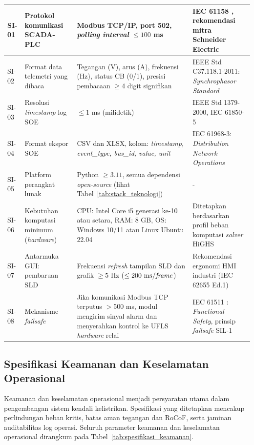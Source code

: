 \begin{longtable}{|p{0.8cm}|p{3.5cm}|p{4.5cm}|p{5cm}|}
SI-01 & Protokol komunikasi SCADA-PLC & Modbus TCP/IP, port 502, \textit{polling interval} $\le 100$ ms & IEC 61158 \cite{IEC61158}, rekomendasi mitra Schneider Electric \\ \hline
SI-02 & Format data telemetri yang dibaca & Tegangan (V), arus (A), frekuensi (Hz), status CB (0/1), presisi pembacaan $\ge 4$ digit signifikan & IEEE Std C37.118.1-2011: \textit{Synchrophasor Standard} \\ \hline
SI-03 & Resolusi \textit{timestamp} log SOE & $\le 1$ ms (milidetik) & IEEE Std 1379-2000, IEC 61850-5 \cite{IEC61850_5_2013} \\ \hline
SI-04 & Format ekspor SOE & CSV dan XLSX, kolom: \textit{timestamp, event\_type, bus\_id, value, unit} & IEC 61968-3: \textit{Distribution Network Operations} \\ \hline
SI-05 & Platform perangkat lunak & Python $\ge 3.11$, semua dependensi \textit{open-source} (lihat Tabel~\ref{tab:stack_teknologi}) & - \\ \hline
SI-06 & Kebutuhan komputasi minimum (\textit{hardware}) & CPU: Intel Core i5 generasi ke-10 atau setara, RAM: 8 GB, OS: Windows 10/11 atau Linux Ubuntu 22.04 & Ditetapkan berdasarkan profil beban komputasi \textit{solver} HiGHS \\ \hline
SI-07 & Antarmuka GUI: pembaruan SLD & Frekuensi \textit{refresh} tampilan SLD dan grafik $\ge 5$ Hz ($\le 200 \text{ ms/\textit{frame}}$) & Rekomendasi ergonomi HMI industri (IEC 62655 Ed.1) \\ \hline
SI-08 & Mekanisme \textit{failsafe} & Jika komunikasi Modbus TCP terputus $> 500$ ms, modul mengirim sinyal alarm dan menyerahkan kontrol ke UFLS \textit{hardware} relai & IEC 61511 \cite{IEC61511_2016}: \textit{Functional Safety}, prinsip \textit{failsafe} SIL-1 \\
\end{longtable}

\subsection{Spesifikasi Keamanan dan Keselamatan Operasional}
\label{subsec:Spesifikasi_Keamanan_Operasional}

Keamanan dan keselamatan operasional menjadi persyaratan utama dalam pengembangan sistem kendali kelistrikan. Spesifikasi yang ditetapkan mencakup perlindungan beban kritis, batas aman tegangan dan RoCoF, serta jaminan auditabilitas log operasi. Seluruh parameter keamanan dan keselamatan operasional dirangkum pada Tabel~\ref{tab:spesifikasi_keamanan}.

